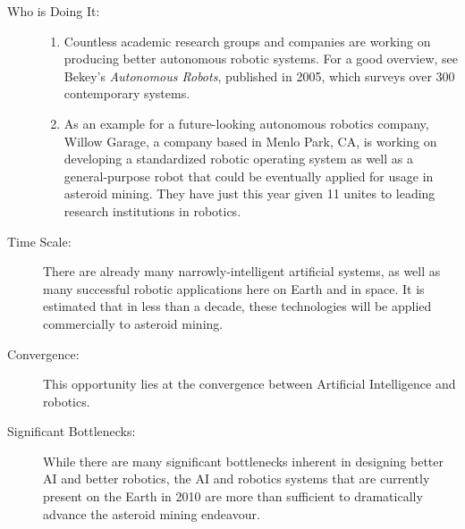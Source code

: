 \begin{description}
\item[Who is Doing It:]
\hfill
\begin{enumerate}
\item Countless academic research groups and companies are working on producing
better autonomous robotic systems. For a good overview, see Bekey's
\emph{Autonomous Robots}, published in 2005, which surveys over 300
contemporary systems\cite{bekey}.
\item As an example for a future-looking autonomous robotics company, Willow
Garage, a company based in Menlo Park, CA, is working on developing
a standardized robotic operating system as well as a general-purpose
robot that could be eventually applied for usage in asteroid mining.
They have just this year given 11 unites to leading research institutions
in robotics\cite{willow}.
\end{enumerate}

\item[Time Scale:]

There are already many narrowly-intelligent artificial systems, as
well as many successful robotic applications here on Earth and in
space. It is estimated that in less than a decade, these technologies
will be applied commercially to asteroid mining.


\item[Convergence:]

This opportunity lies at the convergence between Artificial Intelligence
and robotics.


\item[Significant Bottlenecks:]

While there are many significant bottlenecks inherent in designing
better AI and better robotics, the AI and robotics systems that are
currently present on the Earth in 2010 are more than sufficient to
dramatically advance the asteroid mining endeavour.
\end{description}
 
